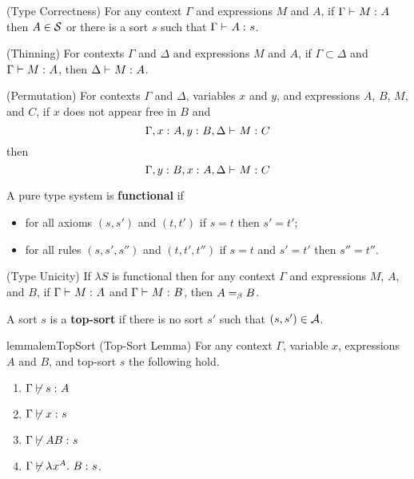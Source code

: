 \documentclass{article}
\begin{document}
\begin{lemma}
\label{lem:type-correctness}
(Type Correctness)
For any context $\Gamma$ and expressions $M$ and $A$, if $\Gamma \vdash_{} {{M} :^{} {A}}$ then $A \in \mathcal S$ or there is a sort $s$ such that $\Gamma \vdash_{} {{A} :^{} {s}}$.
\end{lemma}

\begin{lemma}
\label{lem:thinning}
(Thinning)
For contexts $\Gamma$ and $\Delta$ and expressions $M$ and $A$, if  $\Gamma \subset \Delta$ and $\Gamma \vdash_{} {{M} :^{} {A}}$, then $\Delta \vdash_{} {{M} :^{} {A}}$.
\end{lemma}

\begin{lemma}
\label{lem:permutation}
(Permutation) For contexts $\Gamma$ and $\Delta$, variables $x$ and $y$, and expressions $A$, $B$, $M$, and $C$, if $x$ does not appear free in $B$ and
\[
    \judgment{
        \Gamma, \statement x A, \statement y B, \Delta
    }{M}{C}
\]
then
\[
    \judgment{
        \Gamma, \statement y B, \statement x A, \Delta
    }{M}{C}
\]
\end{lemma}

\begin{definition}
\label{def:functional}
A pure type system is \textbf{functional} if
\begin{itemize}
    \item for all axioms $(s, s')$ and $(t, t')$ if $s = t$ then $s' = t'$;
    \item for all rules $(s, s', s'')$ and $(t, t', t'')$ if $s = t$ and $s' = t'$ then $s''  = t''$.
\end{itemize}
\end{definition}

\begin{lemma}
\label{lem:unicity}
(Type Unicity)
If $\lambda S$ is functional then for any context $\Gamma$ and expressions $M$, $A$, and $B$, if $\Gamma \vdash_{} {{M} :^{} {A}}$ and $\Gamma \vdash_{} {{M} :^{} {B}}$, then $A =_\beta B$.
\end{lemma}

\begin{definition}
A sort $s$ is a \textbf{top-sort} if there is no sort $s'$ such that $(s, s') \in \mathcal A$.
\end{definition}

\begin{restatable}{lemma}{lemTopSort}
\label{lem:top-sort}
(Top-Sort Lemma)
For any context $\Gamma$, variable $x$, expressions $A$ and $B$, and top-sort $s$ the following hold.
\begin{enumerate}
    \item $\Gamma \not \vdash {{s} :^{} {A}}$
    \item $\Gamma \not \vdash {{x} :^{} {s}}$
    \item $\Gamma \not \vdash {{AB} :^{} {s}}$
    \item $\Gamma \not \vdash {{\lambda^{} x^{A}. \ B} :^{} {s}}$.
\end{enumerate}
\end{restatable}
\end{document}
